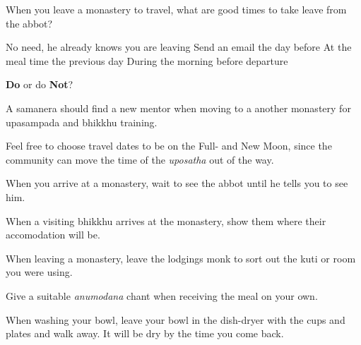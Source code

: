 \begin{exam}{\autoExamName}
\problemDivide

\begin{problem}

  When you leave a monastery to travel, what are good times to take leave from
  the abbot?

  \bigskip

  \begin{answers}{1}
    \bChoices
     No need, he already knows you are leaving\eAns
     Send an email the day before\eAns
     At the meal time the previous day\eAns
     During the morning before departure\eAns
    \eChoices
  \end{answers}

\end{problem}

\problemDivide

\begin{problem*}

  \textbf{Do} or do \textbf{Not}?

  \bigskip

  \begin{parts}

  \item {} A samanera should find a new mentor when moving to a another
    monastery for upasampada and bhikkhu training.

  \item {} Feel free to choose travel dates to be on the Full- and New Moon,
    since the community can move the time of the \textit{uposatha} out of the way.

  \item {} When you arrive at a monastery, wait to see the abbot until he
    tells you to see him.

  \item {} When a visiting bhikkhu arrives at the monastery, show them where
    their accomodation will be.

  \item {} When leaving a monastery, leave the lodgings monk to sort out the
    kuti or room you were using.

  \item {} Give a suitable \textit{anumodana} chant when receiving the meal
    on your own.

  \item {} When washing your bowl, leave your bowl in the dish-dryer with
    the cups and plates and walk away. It will be dry by the time you come back.


\end{parts}
\end{problem*}
\end{exam}

